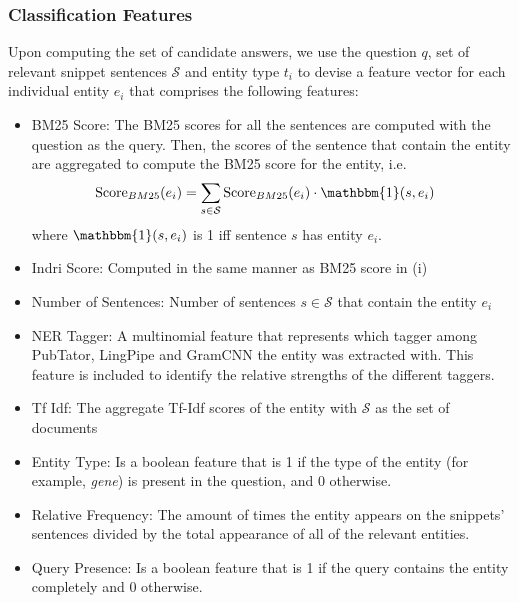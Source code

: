 \subsubsection{Classification Features}\label{sec:classification_features}

Upon computing the set of candidate answers, we use the question $q$, set of relevant snippet sentences $\mathcal{S}$ and entity type $t_i$ to devise a feature vector for each individual entity $e_i$ that comprises the following features:

\begin{itemize}[noitemsep]
    \item BM25 Score: The BM25 scores for all the sentences are computed with the question as the query. Then, the scores of the sentence that contain the entity are aggregated to compute the BM25 score for the entity, i.e.
    \begin{align*}
        \text{Score}_{BM25}(e_i) &= \sum_{s \in \mathcal{S}} \text{Score}_{BM25}(e_i) \cdot \mathbbm{1}(s, e_i)
    \end{align*}
    where $\mathbbm{1}(s, e_i)$ is 1 iff sentence $s$ has entity $e_i$.
    \item Indri Score: Computed in the same manner as BM25 score in (i)
    \item Number of Sentences: Number of sentences $s \in \mathcal{S}$ that contain the entity $e_i$
    \item NER Tagger: A multinomial feature that represents which tagger among PubTator, LingPipe and GramCNN the entity was extracted with. This feature is included to identify the relative strengths of the different taggers.
    \item Tf Idf: The aggregate Tf-Idf scores of the entity with $\mathcal{S}$ as the set of documents
    \item Entity Type: Is a boolean feature that is 1 if the type of the entity (for example, \textit{gene}) is present in the question, and 0 otherwise.
    \item Relative Frequency: The amount of times the entity appears on the snippets' sentences divided by the total appearance of all of the relevant entities.
    \item Query Presence: Is a boolean feature that is 1 if the query contains the entity completely and 0 otherwise.

\end{itemize}

